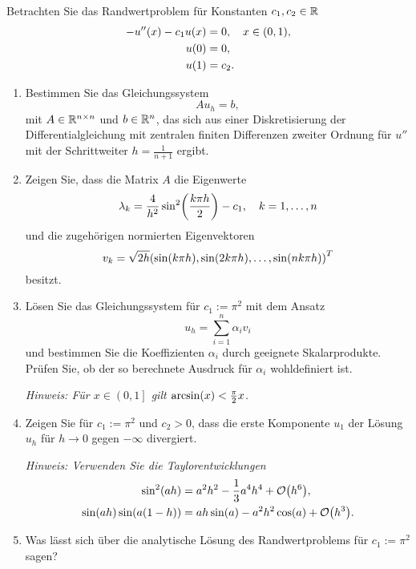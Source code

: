 \documentclass{exercise}
\begin{document}
    \begin{problem}
        Betrachten Sie das Randwertproblem für Konstanten \(c_1, c_2 \in \mathbb{R}\)
        \begin{align*}
            -u''\parentheses*{x} - c_1 u\parentheses*{x} &= 0, \quad x \in \parentheses*{0, 1},\\
            u\parentheses*{0} &= 0,\\
            u\parentheses*{1} &= c_2.
        \end{align*}
        \begin{enumerate}
            \item Bestimmen Sie das Gleichungssystem
            \[
                Au_h = b,
            \]
            mit \(A \in \mathbb{R}^{n \times n}\) und \(b \in \mathbb{R}^n\), das sich aus einer Diskretisierung der Differentialgleichung mit zentralen finiten Differenzen zweiter Ordnung für \(u''\) mit der Schrittweiter \(h = \frac{1}{n + 1}\) ergibt.
            \item Zeigen Sie, dass die Matrix \(A\) die Eigenwerte
            \[
                \lambda_k = \frac{4}{h^2}\sin^2\parentheses*{\frac{k\pi h}{2}} - c_1, \quad k = 1, \ldots, n
            \]
            und die zugehörigen normierten Eigenvektoren
            \[
                v_k = \sqrt{2h}\parentheses*{\sin\parentheses*{k\pi h}, \sin\parentheses*{2k\pi h}, \ldots, \sin\parentheses*{nk\pi h}}^T
            \]
            besitzt.
            \item Lösen Sie das Gleichungssystem für \(c_1 := \pi^2\) mit dem Ansatz
            \[
                u_h = \sum_{i = 1}^n \alpha_i v_i
            \]
            und bestimmen Sie die Koeffizienten \(\alpha_i\) durch geeignete Skalarprodukte.
            Prüfen Sie, ob der so berechnete Ausdruck für \(\alpha_i\) wohldefiniert ist.

            \emph{Hinweis: Für \(x \in \left(0, 1\right]\) gilt \(\arcsin\parentheses*{x} < \frac{\pi}{2}x\).}
            \item Zeigen Sie für \(c_1 := \pi^2\) und \(c_2 > 0\), dass die erste Komponente \(u_1\) der Lösung \(u_h\) für \(h \to 0\) gegen \(-\infty\) divergiert.

            \emph{Hinweis: Verwenden Sie die Taylorentwicklungen
            \begin{align*}
                \sin^2\parentheses*{ah} &= a^2 h^2 - \frac{1}{3}a^4 h^4 + \mathcal{O}\parentheses*{h^6},\\
                \sin\parentheses*{ah}\sin\parentheses*{a\parentheses*{1 - h}} &= ah\sin\parentheses*{a} - a^2 h^2 \cos\parentheses*{a} + \mathcal{O}\parentheses*{h^3}.
            \end{align*}}
            \item Was lässt sich über die analytische Lösung des Randwertproblems für \(c_1 := \pi^2\) sagen?
        \end{enumerate}
    \end{problem}
    
\end{document}
